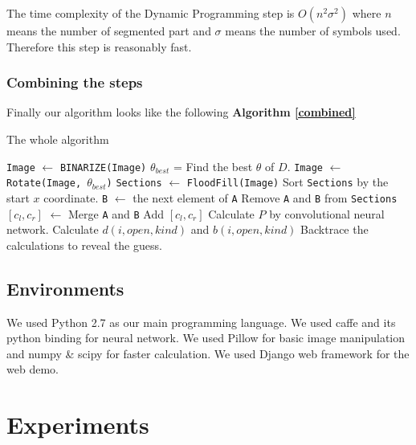 \documentclass[10pt,twocolumn,letterpaper]{article}
\begin{document}
The time complexity of the Dynamic Programming step is $O(n^2 \sigma^2)$ where $n$ means the number of segmented part and
$\sigma$ means the number of symbols used. Therefore this step is reasonably fast.


\subsubsection{Combining the steps}


Finally our algorithm looks like the following \textbf{Algorithm  \ref{combined}}
\begin{algorithm}
\caption{The whole algorithm}
\label{combined}
\begin{algorithmic}[1]
\State \texttt{Image} $\gets$ \texttt{BINARIZE(Image)}
\State $\theta_{best}$ = Find the best $\theta$ of $D$.
\State \texttt{Image} $\gets$ \texttt{Rotate(Image, $\theta_{best}$)}
\State \texttt{Sections} $\gets$ \texttt{FloodFill(Image)}
\State Sort \texttt{Sections} by the start $x$ coordinate.
    \State \texttt{B} $\gets$ the next element of \texttt{A}
        \State Remove \texttt{A} and \texttt{B} from \texttt{Sections}
        \State $[c_{l}, c_{r}]$ $\gets$ Merge \texttt{A} and \texttt{B}
        \State Add $[c_{l}, c_{r}]$
    \EndIf
\EndFor
{}
    \State Calculate $P$ by convolutional neural network.
\EndFor
\State Calculate $d(i, open, kind)$ and $b(i, open, kind)$
\State Backtrace the calculations to reveal the guess.
\end{algorithmic}
\end{algorithm}


\subsection{Environments}

We used Python 2.7 as our main programming language.
We used caffe and its python binding for neural network.
We used Pillow for basic image manipulation and numpy \& scipy for faster calculation.
We used Django web framework for the web demo.

\section{Experiments}

%
%
%
%
%
\end{document}

